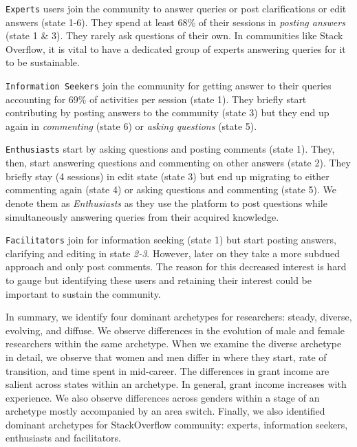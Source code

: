 \texttt{Experts} users join the community to answer queries or post clarifications or edit answers (state 1-6). They spend at least 68\% of their sessions in \emph{posting answers} (state 1 \& 3). They rarely ask questions of their own. In
communities like Stack Overflow, it is vital to have a dedicated group of experts answering queries for it to be sustainable.

\texttt{Information Seekers}
join the community for getting answer to their queries accounting for 69\% of activities per session (state 1). They briefly start contributing by posting answers to the community (state 3) but they end up again in \emph{commenting} (state 6) or \emph{asking questions} (state 5).

\texttt{Enthusiasts} start by asking questions and posting comments (state 1). They, then, start answering questions and commenting on other answers (state 2). They briefly stay (4 sessions) in edit state (state 3) but end up migrating to either commenting again (state 4) or asking questions and commenting (state 5). We denote them as \emph{Enthusiasts} as they use the platform to post questions while simultaneously answering queries from their acquired knowledge.

\texttt{Facilitators} join for information seeking (state 1) but start posting answers, clarifying and editing in state \emph{2-3}. However, later on they take a more subdued approach and only post comments. The reason for this decreased interest is hard to gauge but identifying these users and retaining their interest could be important to sustain the community.


In summary, we identify four dominant archetypes for researchers: steady, diverse, evolving, and diffuse. We observe differences in the evolution of male and female researchers within the same archetype. When we examine the diverse archetype in detail, we observe that women and men differ in where they start, rate of transition, and time spent in mid-career. The differences in grant income are salient across states within an archetype. In general, grant income increases with experience. We also observe differences across genders within a stage of an archetype mostly accompanied by an area switch. Finally, we also identified dominant archetypes for StackOverflow community: experts, information seekers, enthusiasts and facilitators.
